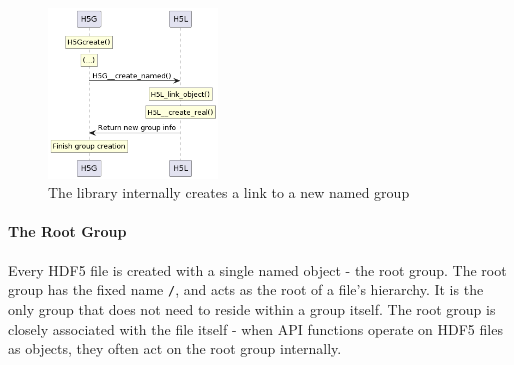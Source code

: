 \begin{figure}
    \centering
    \includegraphics[width=0.40\textwidth]{images/tour_4_group_create.png}
    \caption{The library internally creates a link to a new named group}
    \label{fig:tour-4-uml-group-create}
\end{figure}

\paragraph{The Root Group} Every HDF5 file is created with a single named object - the root group. The root group has the fixed name \texttt{/}, and acts as the root of a file's hierarchy. It is the only group that does not need to reside within a group itself. The root group is closely associated with the file itself - when API functions operate on HDF5 files as objects, they often act on the root group internally.

